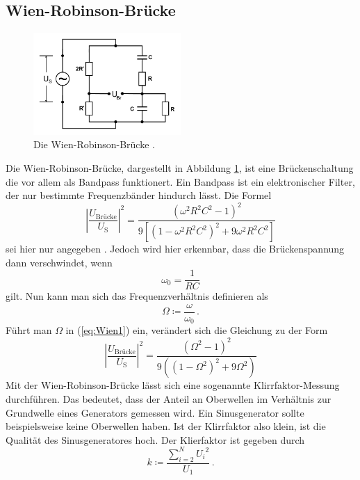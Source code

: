 \subsection{Wien-Robinson-Brücke}

\begin{figure}
    \centering
    \includegraphics[width=0.5\textwidth]{pictures/schaltung6.pdf}
    \caption{Die Wien-Robinson-Brücke \cite[8]{v302}.}
    \label{fig:Schaltung6}
\end{figure}

Die Wien-Robinson-Brücke, dargestellt in Abbildung \ref{fig:Schaltung6}, ist eine Brückenschaltung
die vor allem als Bandpass funktionert. 
Ein Bandpass ist ein elektronischer Filter, der  nur bestimmte Frequenzbänder hindurch lässt.
Die Formel
\begin{equation} \label{eq:Wien1}
    \left|\frac{U_\text{Brücke}}{U_\text{S}}\right|^2 =  \frac{\left({\omega}^2 R^2 C^2 -1 \right)^2}
    {9 \left[ \left( 1 - {\omega}^2 R^2 C^2 \right)^2 + 9 {\omega}^2 R^2 C^2 \right]}
\end{equation}
sei hier nur angegeben \cite[9]{v302}.
Jedoch wird hier erkennbar, dass die Brückenspannung dann verschwindet, wenn
\begin{equation*}
    \omega_0 = \frac{1}{R C}
\end{equation*}
gilt. Nun kann man sich das Frequenzverhältnis definieren als
\begin{equation*}
    \Omega \coloneq \frac{\omega}{\omega_0} \, .
\end{equation*}
Führt man $\Omega$ in (\ref{eq:Wien1}) ein, verändert sich die Gleichung zu der Form
\begin{equation} \label{eq:Wien2}
    \left|\frac{U_\text{Brücke}}{U_\text{S}}\right|^2 = \frac{\left( \Omega^2 -1 \right)^2}
    {9 \left( \left( 1 - \Omega^2 \right)^2 + 9 \Omega^2 \right)}
\end{equation}
Mit der Wien-Robinson-Brücke lässt sich eine sogenannte Klirrfaktor-Messung durchführen.
Das bedeutet, dass der Anteil an Oberwellen im Verhältnis zur Grundwelle eines Generators gemessen wird.
Ein Sinusgenerator sollte beispielsweise keine Oberwellen haben.
Ist der Klirrfaktor also klein, ist die Qualität des Sinusgeneratores hoch.
Der Klierfaktor ist gegeben durch
\begin{equation} \label{eq:klirr}
    k \coloneq \frac {\sum_{i=2}^{N} {U_i}^2}{U_1}  \, .
\end{equation}